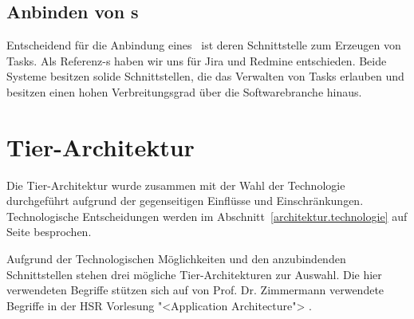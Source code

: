 		
		\subsection{Anbinden von \ppt s}
			Entscheidend für die Anbindung eines \ppt\ ist deren Schnittstelle zum Erzeugen von Tasks. 
			Als Referenz-\ppt s haben wir uns für Jira und Redmine entschieden.
			Beide Systeme besitzen solide Schnittstellen,
			die das Verwalten von Tasks erlauben 
			und besitzen einen hohen Verbreitungsgrad über die Softwarebranche hinaus.
		

	\section{Tier-Architektur}
		Die Tier-Architektur wurde zusammen mit der Wahl der Technologie durchgeführt aufgrund der gegenseitigen Einflüsse und Einschränkungen.
		Technologische Entscheidungen werden im Abschnitt~\ref{architektur.technologie} auf 
Seite \pageref{architektur.technologie} besprochen.
		
		Aufgrund der Technologischen Möglichkeiten und den anzubindenden Schnittstellen stehen drei mögliche Tier-Architekturen zur Auswahl.
		Die hier verwendeten Begriffe stützen sich auf von Prof. Dr. Zimmermann verwendete Begriffe in der HSR Vorlesung "<Application Architecture"> \cite{prof._dr._zimmerman_layers_2014}.		
		
